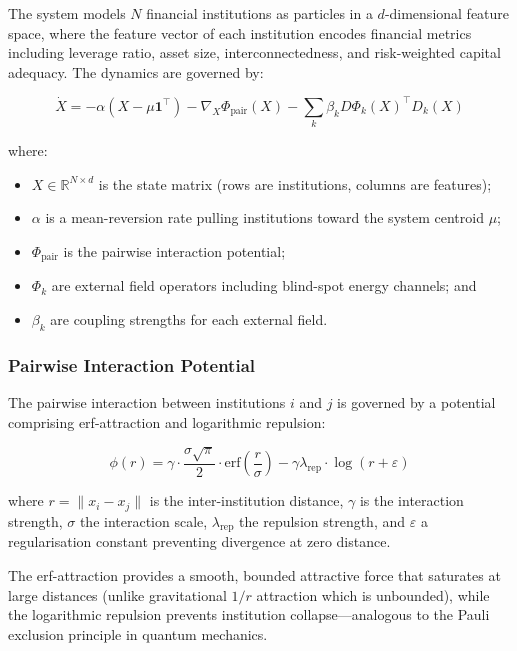 \documentclass[12pt,a4paper]{article}
\begin{document}
The system models $N$ financial institutions as particles in a 
$d$-dimensional feature space, where the feature vector of each institution 
encodes financial metrics including leverage ratio, asset size, 
interconnectedness, and risk-weighted capital adequacy. The dynamics are 
governed by:

\begin{equation}
\dot{X} = -\alpha(X - \mu\mathbf{1}^\top) - \nabla_X \Phi_{\text{pair}}(X) 
- \sum_{k} \beta_k D\Phi_k(X)^\top D_k(X)
\end{equation}

where:
\begin{itemize}
\item $X \in \mathbb{R}^{N \times d}$ is the state matrix (rows are 
institutions, columns are features);
\item $\alpha$ is a mean-reversion rate pulling institutions toward the 
system centroid $\mu$;
\item $\Phi_{\text{pair}}$ is the pairwise interaction potential;
\item $\Phi_k$ are external field operators including blind-spot energy 
channels; and
\item $\beta_k$ are coupling strengths for each external field.
\end{itemize}

\subsubsection{Pairwise Interaction Potential}

The pairwise interaction between institutions $i$ and $j$ is governed by a 
potential comprising erf-attraction and logarithmic repulsion:

\begin{equation}
\phi(r) = \gamma \cdot \frac{\sigma\sqrt{\pi}}{2} \cdot 
\text{erf}\left(\frac{r}{\sigma}\right) - \gamma \lambda_{\text{rep}} 
\cdot \log(r + \varepsilon)
\end{equation}

where $r = \|x_i - x_j\|$ is the inter-institution distance, $\gamma$ is 
the interaction strength, $\sigma$ the interaction scale, 
$\lambda_{\text{rep}}$ the repulsion strength, and $\varepsilon$ a 
regularisation constant preventing divergence at zero distance.

The erf-attraction provides a smooth, bounded attractive force that 
saturates at large distances (unlike gravitational $1/r$ attraction which 
is unbounded), while the logarithmic repulsion prevents institution 
collapse---analogous to the Pauli exclusion principle in quantum mechanics.
\end{document}
